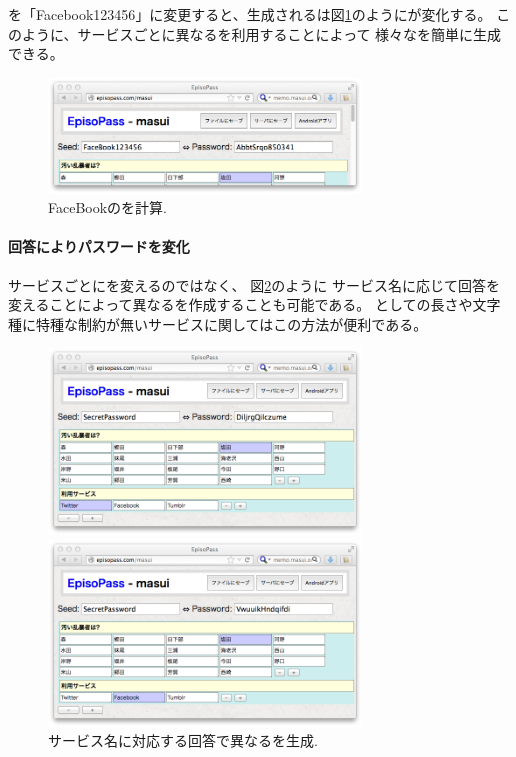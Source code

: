 \documentclass[twoside]{wiss}
\begin{document}
{\SS}を「\textsf{Facebook123456}」に変更すると、生成される{\PW}は図\ref{web2}のようにが変化する。
このように、サービスごとに異なる{\SS}を利用することによって
様々な{\PW}を簡単に生成できる。

\begin{figure}[H]
\centerline{\includegraphics[width=83mm,bb=0 0 718 265]{figures/36c371a13a8250c60fb9c03174382443.png}}
\caption{FaceBookの{\PW}を計算.}
\label{web2}
\end{figure}

\paragraph{回答によりパスワードを変化}

サービスごとに{\SS}を変えるのではなく、
図\ref{web3}のように
サービス名に応じて回答を変えることによって異なる{\PW}を作成することも可能である。
{\PW}としての長さや文字種に特種な制約が無いサービスに関してはこの方法が便利である。

\begin{figure}[H]
\centerline{\includegraphics[width=83mm,bb=0 0 718 428]{figures/a9167a6ec6af9c70dd1617e3fc25ec30.png}}
\centerline{\includegraphics[width=83mm,bb=0 0 718 428]{figures/5b887fabeb8e3319623901fe4a6c56f2.png}}
\caption{サービス名に対応する回答で異なる{\PW}を生成.}
\label{web3}
\end{figure}
\end{document}
